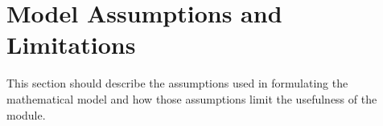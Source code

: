 \section{Model Assumptions and Limitations}
This section should describe the assumptions used in formulating the mathematical model and how those assumptions limit the usefulness of the module.